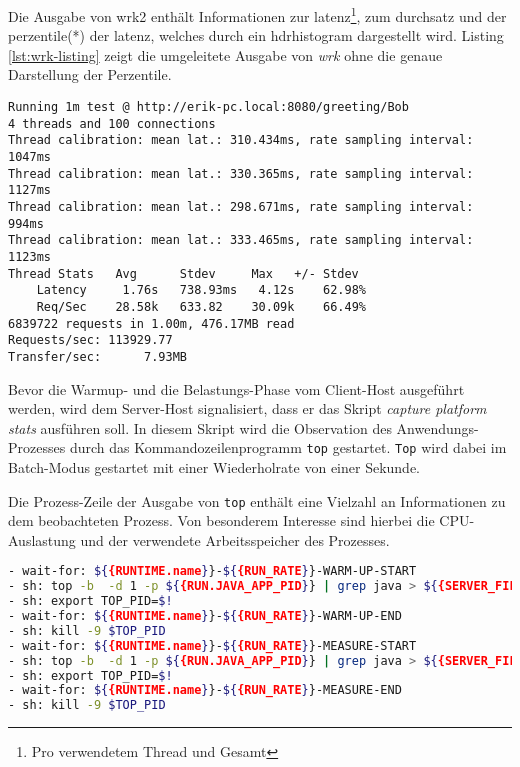 Die Ausgabe von wrk2 enthält Informationen zur \Gls{latenz}\footnote{Pro verwendetem Thread und Gesamt},
zum \Gls{durchsatz} und der \Gls{perzentile}(*) der \Gls{latenz}, welches durch ein \acrshort{hdrhistogram} dargestellt wird.
Listing \ref*{lst:wrk-listing} zeigt die umgeleitete Ausgabe von \textit{wrk} ohne die genaue Darstellung der Perzentile.

\begin{lstlisting}[caption=Beispiel für Ausgabe von wrk,captionpos=b, label=lst:wrk-listing]
Running 1m test @ http://erik-pc.local:8080/greeting/Bob
4 threads and 100 connections
Thread calibration: mean lat.: 310.434ms, rate sampling interval: 1047ms
Thread calibration: mean lat.: 330.365ms, rate sampling interval: 1127ms
Thread calibration: mean lat.: 298.671ms, rate sampling interval: 994ms
Thread calibration: mean lat.: 333.465ms, rate sampling interval: 1123ms
Thread Stats   Avg      Stdev     Max   +/- Stdev
	Latency     1.76s   738.93ms   4.12s    62.98%
	Req/Sec    28.58k   633.82    30.09k    66.49%
6839722 requests in 1.00m, 476.17MB read
Requests/sec: 113929.77
Transfer/sec:      7.93MB
\end{lstlisting}

Bevor die Warmup- und die Belastungs-Phase vom Client-Host ausgeführt werden, wird dem Server-Host signalisiert, dass
er das Skript \textit{capture platform stats} ausführen soll.
In diesem Skript wird die Observation des Anwendungs-Prozesses durch das Kommandozeilenprogramm \verb|top| gestartet.
\verb|Top| wird dabei im Batch-Modus gestartet mit einer Wiederholrate von einer Sekunde.

Die Prozess-Zeile der Ausgabe von \verb|top| enthält eine Vielzahl an Informationen zu dem beobachteten Prozess. Von besonderem
Interesse sind hierbei die CPU-Auslastung und der verwendete Arbeitsspeicher des Prozesses. \parencite{linuxTopManual}

\begin{lstlisting}[language=sh, caption=Auszug des qDup Skripts capture-platform-stats, captionpos=b]
- wait-for: ${{RUNTIME.name}}-${{RUN_RATE}}-WARM-UP-START
- sh: top -b  -d 1 -p ${{RUN.JAVA_APP_PID}} | grep java > ${{SERVER_FILE_PATH}}/output/${{RUNTIME.name}}-${{RUN_RATE}}-WARM-UP-top.out &
- sh: export TOP_PID=$!
- wait-for: ${{RUNTIME.name}}-${{RUN_RATE}}-WARM-UP-END
- sh: kill -9 $TOP_PID
- wait-for: ${{RUNTIME.name}}-${{RUN_RATE}}-MEASURE-START
- sh: top -b  -d 1 -p ${{RUN.JAVA_APP_PID}} | grep java > ${{SERVER_FILE_PATH}}/output/${{RUNTIME.name}}-${{RUN_RATE}}-MEASURE-top.out &
- sh: export TOP_PID=$!
- wait-for: ${{RUNTIME.name}}-${{RUN_RATE}}-MEASURE-END
- sh: kill -9 $TOP_PID
  \end{lstlisting}

